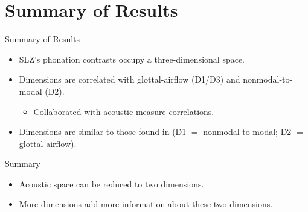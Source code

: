 \documentclass{beamer}
\begin{document}


\section*{Summary of Results}
\begin{frame}{Summary of Results}
  \begin{itemize}
    \item SLZ's phonation contrasts occupy a three-dimensional space.
    \item Dimensions are correlated with glottal-airflow (D1/D3) and nonmodal-to-modal (D2).
    \begin{itemize}
      \item Collaborated with acoustic measure correlations.
    \end{itemize}
    \item Dimensions are similar to those found in \citeauthor{keatingCrosslanguageAcousticSpace2023} (D1 $=$ nonmodal-to-modal; D2 $=$ glottal-airflow).
  \end{itemize}
\end{frame}

\begin{frame}{Summary}
  \begin{itemize}
    \item Acoustic space can be reduced to two dimensions.
    \item More dimensions add more information about these two dimensions.
  \end{itemize}
  \begin{figure}[h!]
    \centering
\end{figure}
\end{frame}
\end{document}
